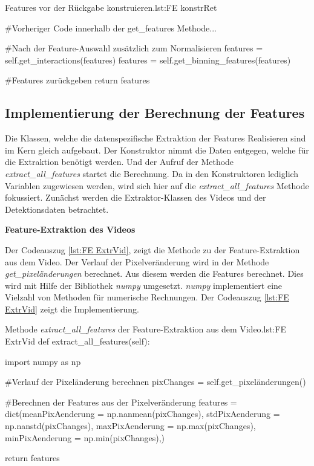 \begin{pythoncode}{Features vor der Rückgabe konstruieren.}{lst:FE konstrRet}

#Vorheriger Code innerhalb der get_features Methode...

#Nach der Feature-Auswahl zusätzlich zum Normalisieren
features = self.get_interactions(features)
features = self.get_binning_features(features)

#Features zurückgeben
return features
\end{pythoncode}



\subsection{Implementierung der Berechnung der Features} \label{sec:Umsetz SubExtrak}
Die Klassen, welche die datenspezifische Extraktion der Features Realisieren sind im Kern gleich aufgebaut. Der Konstruktor nimmt die Daten entgegen, welche für die Extraktion benötigt werden. Und der Aufruf der Methode \textit{extract\_all\_features} startet die Berechnung. Da in den Konstruktoren lediglich Variablen zugewiesen werden, wird sich hier auf die \textit{extract\_all\_features} Methode fokussiert. Zunächst werden die Extraktor-Klassen des Videos und der Detektionsdaten betrachtet. \dubpar

\textbf{Feature-Extraktion des Videos}\par

Der Codeauszug \ref{lst:FE ExtrVid}, zeigt die Methode zu der Feature-Extraktion aus dem Video. Der Verlauf der Pixelveränderung wird in der Methode \textit{get\_pixeländerungen} berechnet. Aus diesem werden die Features berechnet. Dies wird mit Hilfe der Bibliothek \textit{numpy} umgesetzt. \textit{numpy} implementiert eine Vielzahl von Methoden für numerische Rechnungen. Der Codeauszug \ref{lst:FE ExtrVid} zeigt die Implementierung.

\begin{pythoncode}{Methode \textit{extract\_all\_features} der Feature-Extraktion aus dem Video.}{lst:FE ExtrVid}
def extract_all_features(self):

    import numpy as np
        
    #Verlauf der Pixeländerung berechnen 
    pixChanges = self.get_pixeländerungen()

    #Berechnen der Features aus der Pixelveränderung
    features = dict(meanPixAenderung = np.nanmean(pixChanges),
                    stdPixAenderung = np.nanstd(pixChanges),
                    maxPixAenderung = np.max(pixChanges),
                    minPixAenderung = np.min(pixChanges),)
    
    return features

\end{pythoncode}

